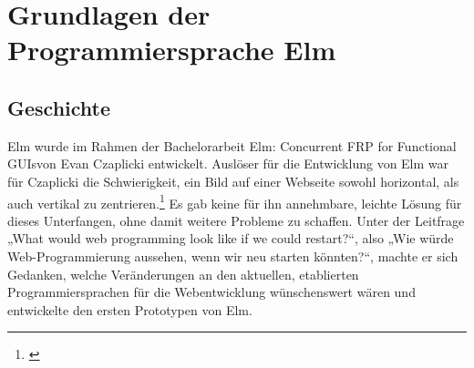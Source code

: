 \section{Grundlagen der Programmiersprache Elm}
\label{sec:grundlagen-programmiersprache-elm}

\subsection{Geschichte}
\label{sec:Geschichte}
Elm wurde im Rahmen der Bachelorarbeit \glqq Elm: Concurrent FRP for Functional GUIs\grqq von Evan Czaplicki entwickelt. \cite[Vgl.]{evan-thesis}
Auslöser für die Entwicklung von Elm war für Czaplicki die Schwierigkeit, ein Bild auf einer Webseite sowohl horizontal, als auch vertikal zu zentrieren.\footnote{\cite[Vgl.]{evan-center}} Es gab keine für ihn annehmbare, leichte Lösung für dieses Unterfangen, ohne damit weitere Probleme zu schaffen. Unter der Leitfrage „What would web programming look like if we could restart?“, also „Wie würde Web-Programmierung aussehen, wenn wir neu starten könnten?“, machte er sich Gedanken, welche Veränderungen an den aktuellen, etablierten Programmiersprachen für die Webentwicklung wünschenswert wären und entwickelte den ersten Prototypen von Elm.

